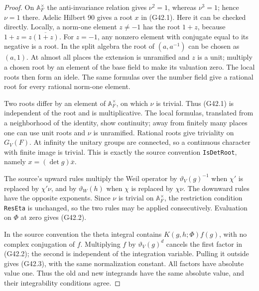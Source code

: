 \begin{proof}
On $\mathbb A_F^\times$ the anti-invariance relation gives
$\nu^2=1$, whereas $\nu^3=1$; hence $\nu=1$ there.
Adelic Hilbert 90 gives a root $x$ in (G42.1).  Here it can
be checked directly.  Locally, a norm-one element $z\ne-1$
has the root $1+z$, because $1+z=z\overline{(1+z)}$.
For $z=-1$, any nonzero element with conjugate equal to
its negative is a root.  In the split algebra the root of
$(a,a^{-1})$ can be chosen as $(a,1)$.  At almost all
places the extension is unramified and $z$ is a unit;
multiply a chosen root by an element of the base field
to make its valuation zero.  The local roots then form
an idele.  The same formulas over the number field give
a rational root for every rational norm-one element.

Two roots differ by an element of $\mathbb A_F^\times$,
on which $\nu$ is trivial.  Thus (G42.1) is independent
of the root and is multiplicative.  The local formulas,
translated from a neighborhood of the identity, show
continuity; away from finitely many places one can use
unit roots and $\nu$ is unramified.  Rational roots give
triviality on $G_V(F)$.  At infinity the unitary groups
are connected, so a continuous character with finite
image is trivial.  This is exactly the source convention
\texttt{IsDetRoot}, namely $x=(\det g)\overline x$.

The source's upward rules multiply the Weil operator
by $\vartheta_V(g)^{-1}$ when $\chi'$ is replaced by
$\chi'\nu$, and by $\vartheta_W(h)$ when $\chi$ is
replaced by $\chi\nu$.  The downward rules have the
opposite exponents.  Since $\nu$ is trivial on
$\mathbb A_F^\times$, the restriction condition
\texttt{ResEta} is unchanged, so the two rules may be
applied consecutively.  Evaluation on $\Phi$ at zero
gives (G42.2).

In the source convention the theta integral contains
$K(g,h;\Phi)f(g)$, with no complex conjugation of $f$.
Multiplying $f$ by $\vartheta_V(g)^d$ cancels the first
factor in (G42.2); the second is independent of the
integration variable.  Pulling it outside gives
(G42.3), with the same normalization constant.
All factors have absolute value one.  Thus the old and
new integrands have the same absolute value, and their
integrability conditions agree.


\end{proof}
